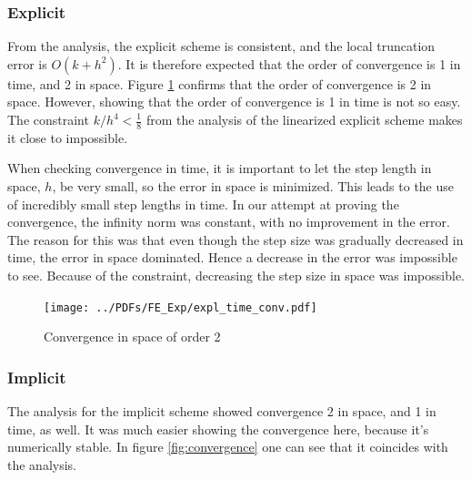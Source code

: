 \subsubsection{Explicit}
From the analysis, the explicit scheme is consistent, and the local truncation error is $O(k + h^2)$. It is therefore expected that the order of convergence is 1 in time, and 2 in space. Figure \ref{fig:convFE_time} confirms that the order of convergence is 2 in space. However, showing that the order of convergence is 1 in time is not so easy. The constraint $k/h^4 < \frac{1}{8}$ from the analysis of the linearized explicit scheme makes it close to impossible. 

When checking convergence in time, it is important to let the step length in space, $h$, be very small, so the error in space is minimized. This leads to the use of incredibly small step lengths in time. In our attempt at proving the convergence, the infinity norm was constant, with no improvement in the error. The reason for this was that even though the step size was gradually decreased in time, the error in space dominated. Hence a decrease in the error was impossible to see. Because of the constraint, decreasing the step size in space was impossible.

 
\begin{figure}[H]
\centering
\texttt{[image: ../PDFs/FE\_Exp/expl\_time\_conv.pdf]}
\caption{Convergence in space of order 2}
\label{fig:convFE_time}
\end{figure} 

\subsubsection{Implicit}
The analysis for the implicit scheme showed convergence 2 in space, and 1 in time, as well. It was much easier showing the convergence here, because it's numerically stable. In figure \ref{fig:convergence} one can see that it coincides with the analysis.

